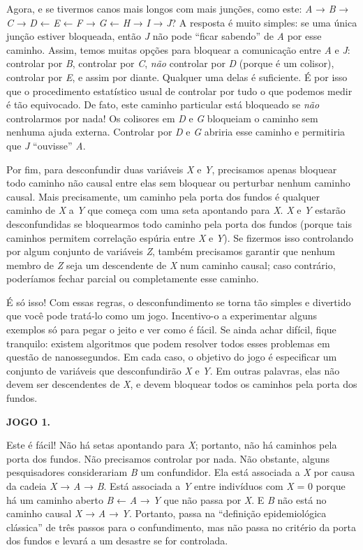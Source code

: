 \documentclass[11pt,a5paper,twoside]{book}
\begin{document}
Agora, e se tivermos canos mais longos com mais junções, como este: \textit{A} → \textit{B} → \textit{C} → \textit{D} ← \textit{E} ← \textit{F} → \textit{G} ← \textit{H} → \textit{I} → \textit{J}? A resposta é muito simples: se uma única junção estiver bloqueada, então \textit{J} não pode “ficar sabendo” de \textit{A} por esse caminho. Assim, temos muitas opções para bloquear a comunicação entre \textit{A} e \textit{J}: controlar por \textit{B}, controlar por \textit{C}, \textit{não} controlar por \textit{D} (porque é um colisor), controlar por \textit{E}, e assim por diante. Qualquer uma delas é suficiente. É por isso que o procedimento estatístico usual de controlar por tudo o que podemos medir é tão equivocado. De fato, este caminho particular está bloqueado se \textit{não} controlarmos por nada! Os colisores em \textit{D} e \textit{G} bloqueiam o caminho sem nenhuma ajuda externa. Controlar por \textit{D} e \textit{G} abriria esse caminho e permitiria que \textit{J} “ouvisse” \textit{A}.

Por fim, para desconfundir duas variáveis \textit{X} e \textit{Y}, precisamos apenas bloquear todo caminho não causal entre elas sem bloquear ou perturbar nenhum caminho causal. Mais precisamente, um caminho pela porta dos fundos é qualquer caminho de \textit{X} a \textit{Y} que começa com uma seta apontando para \textit{X}. \textit{X} e \textit{Y} estarão desconfundidas se bloquearmos todo caminho pela porta dos fundos (porque tais caminhos permitem correlação espúria entre \textit{X} e \textit{Y}). Se fizermos isso controlando por algum conjunto de variáveis \textit{Z}, também precisamos garantir que nenhum membro de \textit{Z} seja um descendente de \textit{X} num caminho causal; caso contrário, poderíamos fechar parcial ou completamente esse caminho.

É só isso! Com essas regras, o desconfundimento se torna tão simples e divertido que você pode tratá-lo como um jogo. Incentivo-o a experimentar alguns exemplos só para pegar o jeito e ver como é fácil. Se ainda achar difícil, fique tranquilo: existem algoritmos que podem resolver todos esses problemas em questão de nanossegundos. Em cada caso, o objetivo do jogo é especificar um conjunto de variáveis que desconfundirão \textit{X} e \textit{Y}. Em outras palavras, elas não devem ser descendentes de \textit{X}, e devem bloquear todos os caminhos pela porta dos fundos.

\textbf{JOGO 1.}

Este é fácil! Não há setas apontando para \textit{X}; portanto, não há caminhos pela porta dos fundos. Não precisamos controlar por nada. Não obstante, alguns pesquisadores considerariam \textit{B} um confundidor. Ela está associada a \textit{X} por causa da cadeia \textit{X} → \textit{A} → \textit{B}. Está associada a \textit{Y} entre indivíduos com \textit{X} = 0 porque há um caminho aberto \textit{B} ← \textit{A} → \textit{Y} que não passa por \textit{X}. E \textit{B} não está no caminho causal \textit{X} → \textit{A} → \textit{Y}. Portanto, passa na “definição epidemiológica clássica” de três passos para o confundimento, mas não passa no critério da porta dos fundos e levará a um desastre se for controlada.
\end{document}
